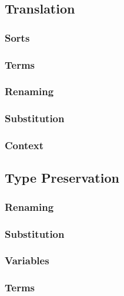 \subsection{Translation}
\subsubsection{Sorts}
\subsubsection{Terms}
\subsubsection{Renaming}
\subsubsection{Substitution}
\subsubsection{Context}
\subsection{Type Preservation}
\subsubsection{Renaming}
\subsubsection{Substitution}
\subsubsection{Variables}
\subsubsection{Terms}